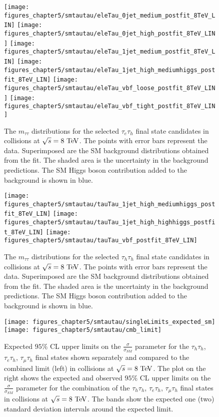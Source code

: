 \begin{figure}[htbp]
\centering
\texttt{[image: figures\_chapter5/smtautau/eleTau\_0jet\_medium\_postfit\_8TeV\_LIN]}
\texttt{[image: figures\_chapter5/smtautau/eleTau\_0jet\_high\_postfit\_8TeV\_LIN]}
\texttt{[image: figures\_chapter5/smtautau/eleTau\_1jet\_medium\_postfit\_8TeV\_LIN]}
\texttt{[image: figures\_chapter5/smtautau/eleTau\_1jet\_high\_mediumhiggs\_postfit\_8TeV\_LIN]}
\texttt{[image: figures\_chapter5/smtautau/eleTau\_vbf\_loose\_postfit\_8TeV\_LIN]}
\texttt{[image: figures\_chapter5/smtautau/eleTau\_vbf\_tight\_postfit\_8TeV\_LIN]}
\caption{The $m_{\tau\tau}$ distributions for the selected $\tau_{e}\tau_{h}$ final state candidates in collisions at $\sqrt{s}=8~\mathrm{Te\kern -0.1em V}$. The points with error bars represent the data. Superimposed are the SM background distributions obtained from the fit. The shaded area is the uncertainty in the background predictions. The SM Higgs boson contribution added to the background is shown in blue.}
\label{fig:etau}
\end{figure}

\begin{figure}[htbp]
\centering
\texttt{[image: figures\_chapter5/smtautau/tauTau\_1jet\_high\_mediumhiggs\_postfit\_8TeV\_LIN]}
\texttt{[image: figures\_chapter5/smtautau/tauTau\_1jet\_high\_highhiggs\_postfit\_8TeV\_LIN]}
\texttt{[image: figures\_chapter5/smtautau/tauTau\_vbf\_postfit\_8TeV\_LIN]}
\caption{The $m_{\tau\tau}$ distributions for the selected $\tau_{h}\tau_{h}$ final state candidates in collisions at $\sqrt{s}=8~\mathrm{Te\kern -0.1em V}$. The points with error bars represent the data. Superimposed are the SM background distributions obtained from the fit. The shaded area is the uncertainty in the background predictions. The SM Higgs boson contribution added to the background is shown in blue.}
\label{fig:tautau}
\end{figure}

\begin{figure}[htbp]
\centering
\texttt{[image: figures\_chapter5/smtautau/singleLimits\_expected\_sm]}
\texttt{[image: figures\_chapter5/smtautau/cmb\_limit]}
\caption{Expected $95\%$ CL upper limits on the $\frac{\sigma}{\sigma_{SM}}$ parameter for the $\tau_{h}\tau_{h}$, $\tau_{e}\tau_{h}$, $\tau_{\mu}\tau_{h}$ final states shown separately and compared to the combined limit (left) in collisions at $\sqrt{s}=8~\mathrm{Te\kern -0.1em V}$. The plot on the right shows the expected and observed $95\%$ CL upper limits on the $\frac{\sigma}{\sigma_{SM}}$ parameter for the combination of the $\tau_{h}\tau_{h}$, $\tau_{e}\tau_{h}$, $\tau_{\mu}\tau_{h}$ final states in collisions at $\sqrt{s}=8~\mathrm{Te\kern -0.1em V}$. The bands show the expected one (two) standard deviation intervals around the expected limit.}
\label{fig:cmblim}
\end{figure}


